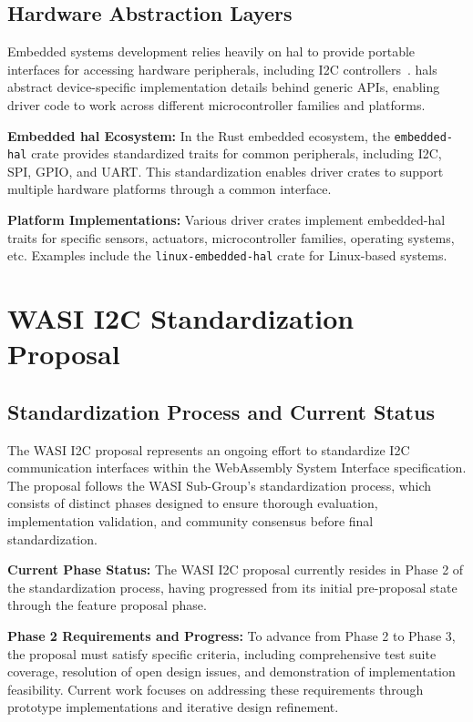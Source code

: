 \subsection{Hardware Abstraction Layers}
\label{subsec:hal-embedded}

Embedded systems development relies heavily on \acrfull{hal} to provide portable interfaces for accessing hardware peripherals, including I2C controllers~\cite{hal}. \acrshort{hal}s abstract device-specific implementation details behind generic APIs, enabling driver code to work across different microcontroller families and platforms.

\textbf{Embedded \acrshort{hal} Ecosystem:} In the Rust embedded ecosystem, the \texttt{embedded-hal} crate provides standardized traits for common peripherals, including I2C, SPI, GPIO, and UART. This standardization enables driver crates to support multiple hardware platforms through a common interface.

\textbf{Platform Implementations:} Various driver crates implement embedded-hal traits for specific sensors, actuators, microcontroller families, operating systems, etc. Examples include the \texttt{linux-embedded-hal} crate for Linux-based systems.

\section{WASI I2C Standardization Proposal}
\label{sec:wasi-i2c-proposal}

\subsection{Standardization Process and Current Status}
\label{subsec:i2c-standardization-process}

The WASI I2C proposal represents an ongoing effort to standardize I2C communication interfaces within the WebAssembly System Interface specification\cite{wasi_i2c_proposal}. The proposal follows the WASI Sub-Group's standardization process, which consists of distinct phases designed to ensure thorough evaluation, implementation validation, and community consensus before final standardization.

\textbf{Current Phase Status:} The WASI I2C proposal currently resides in Phase 2 of the standardization process, having progressed from its initial pre-proposal state through the feature proposal phase.

\textbf{Phase 2 Requirements and Progress:} To advance from Phase 2 to Phase 3, the proposal must satisfy specific criteria, including comprehensive test suite coverage, resolution of open design issues, and demonstration of implementation feasibility. Current work focuses on addressing these requirements through prototype implementations and iterative design refinement.

